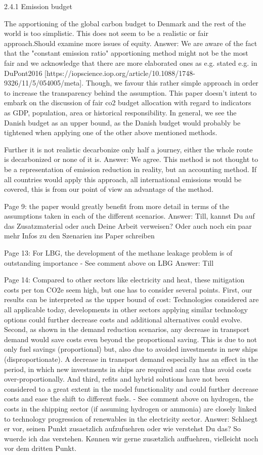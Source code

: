 2.4.1 Emission budget

The apportioning of the global carbon budget to Denmark and the rest of the world is too simplistic. This does not seem to be a realistic or fair approach.Should examine more issues of equity. 
Answer: We are aware of the fact that the "constant emission ratio" apportioning method might not be the most fair and we acknowledge that there are more elaborated ones as e.g. stated e.g. in DuPont2016 [https://iopscience.iop.org/article/10.1088/1748-9326/11/5/054005/meta]. Though, we favour this rather simple approach in order to increase the transparency behind the assumption. This paper doesn't intent to embark on the discussion of fair co2 budget allocation with regard to indicators as GDP, population, area or historical responsibility. In general, we see the Danish budget as an upper bound, as the Danish budget would probably be tightened when applying one of the other above mentioned methods.

Further it is not realistic decarbonize only half a journey, either the whole route is decarbonized or none of it is.
Answer: We agree. This method is not thought to be a representation of emission reduction in reality, but an accounting method. If all countries would apply this approach, all international emissions would be covered, this is from our point of view an advantage of the method.

Page 9: the paper would greatly benefit from more detail in terms of the assumptions taken in each of the different scenarios.
Answer: Till, kannst Du auf das Zusatzmaterial oder auch Deine Arbeit verweisen? Oder auch noch ein paar mehr Infos zu den Szenarien ins Paper schreiben

Page 13: For LBG, the development of the methane leakage problem is of outstanding importance
-	See comment above on LBG
Answer: Till

Page 14: Compared to other sectors like electricity and heat, these mitigation costs per ton CO2e seem high, but one has to consider several points. First, our results can be interpreted as the upper bound of cost: Technologies considered are all applicable today, developments in other sectors applying similar technology options could further decrease costs and additional alternatives could evolve. Second, as shown in the demand reduction scenarios, any decrease in transport demand would save costs even beyond the proportional saving. This is due to not only fuel savings (proportional) but, also due to avoided investments in new ships (disproportionate). A decrease in transport demand especially has an effect in the period, in which new investments in ships are required and can thus avoid costs over-proportionally. And third, refits and hybrid solutions have not been considered to a great extent in the model functionality and could further decrease costs and ease the shift to different fuels. 
-	See comment above on hydrogen, the costs in the shipping sector (if assuming hydrogen or ammonia) are closely linked to technology progression of renewables in the electricity sector.
Answer: Schlaegt er vor, seinen Punkt zusaetzlich aufzufuehren oder wie verstehst Du das? So wuerde ich das verstehen. Kønnen wir gerne zusætzlich auffuehren, vielleicht noch vor dem dritten Punkt.

